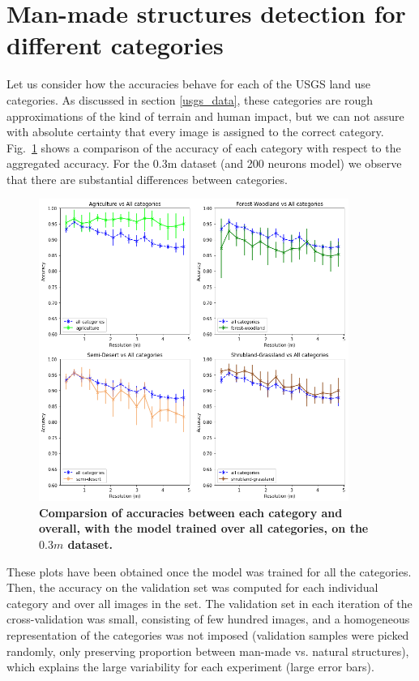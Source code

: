 \section{Man-made structures detection for different categories}

Let us consider how the accuracies behave for each of the USGS land use categories. As discussed in section \ref{usgs_data}, these categories are rough approximations of the kind of terrain and human impact, but we can not assure with absolute certainty that every image is assigned to the correct category. Fig.~\ref{fig:acc_by_cat_03m} shows a comparison of the accuracy of each category with respect to the aggregated accuracy. For the 0.3m dataset (and 200 neurons model) we observe that there are substantial differences between categories. 

\begin{figure}[h!]
	\centering
	\includegraphics[width=0.9\textwidth]{Figures/results/acc_res_by_category_03m.png}
	\captionsetup{width=1\linewidth}
	\caption{\textbf{Comparsion of accuracies between each category and overall, with the model trained over all categories, on the $0.3m$ dataset.}}
	\label{fig:acc_by_cat_03m}
\end{figure}

These plots have been obtained once the model was trained for all the categories. Then, the accuracy on the validation set was computed for each individual category and over all images in the set. The validation set in each iteration of the cross-validation was small, consisting of few hundred images, and a homogeneous representation of the categories was not imposed (validation samples were picked randomly, only preserving proportion between man-made vs. natural structures), which explains the large variability for each experiment (large error bars).

